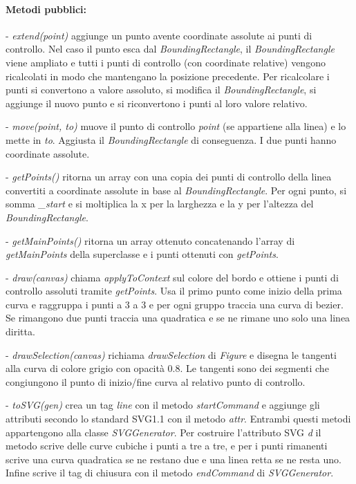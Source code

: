 \paragraph{Metodi pubblici:}
\begin{elencopuntato}[\subsubsecindent]
\item[-] \textit{extend(point)} aggiunge un punto avente coordinate assolute ai punti di controllo. Nel caso il punto esca dal \textit{BoundingRectangle}, il \textit{BoundingRectangle} viene ampliato e tutti i punti di controllo (con coordinate relative) vengono ricalcolati in modo che mantengano la posizione precedente. Per ricalcolare i punti si convertono a valore assoluto, si modifica il \textit{BoundingRectangle}, si aggiunge il nuovo punto e si riconvertono i 
punti al loro valore relativo.
\item[-] \textit{move(point, to)} muove il punto di controllo \textit{point} (se appartiene alla linea) e lo mette in \textit{to}. Aggiusta il \textit{BoundingRectangle} di conseguenza. I due punti hanno coordinate assolute.
\item[-] \textit{getPoints()} ritorna un array con una copia dei punti di controllo della linea convertiti a coordinate assolute in base al \textit{BoundingRectangle}. Per ogni punto, si somma \textit{{\_}start} e si moltiplica la x per la larghezza e la y per l'altezza del \textit{BoundingRectangle}.
\item[-] \textit{getMainPoints()} ritorna un array ottenuto concatenando l'array di \textit{getMainPoints} della superclasse e i punti ottenuti con \textit{getPoints}.
\item[-] \textit{draw(canvas)} chiama \textit{applyToContext} sul colore del bordo e ottiene i punti di controllo assoluti tramite \textit{getPoints}. Usa il primo punto come inizio della prima curva e raggruppa i punti a 3 a 3 e per ogni gruppo traccia una curva di bezier. Se rimangono due punti traccia una quadratica e se ne rimane uno solo una linea diritta.
\item[-] \textit{drawSelection(canvas)} richiama \textit{drawSelection} di \textit{Figure} e disegna le tangenti alla curva di colore grigio con opacit\`a 0.8. Le tangenti sono dei segmenti che congiungono il punto di inizio/fine curva al relativo punto di controllo.
\item[-] \textit{toSVG(gen)} crea un tag \textit{line} con il metodo \textit{startCommand} e aggiunge gli attributi secondo lo standard SVG1.1 con il metodo \textit{attr}. Entrambi questi metodi appartengono alla classe \textit{SVGGenerator}. Per costruire l'attributo SVG \textit{d} il metodo scrive delle curve cubiche i punti a tre a tre, e per i punti rimanenti scrive una curva quadratica se ne restano due e una linea retta se ne resta uno. Infine scrive il tag di chiusura con il metodo \textit{endCommand} di \textit{SVGGenerator}.
\end{elencopuntato}

